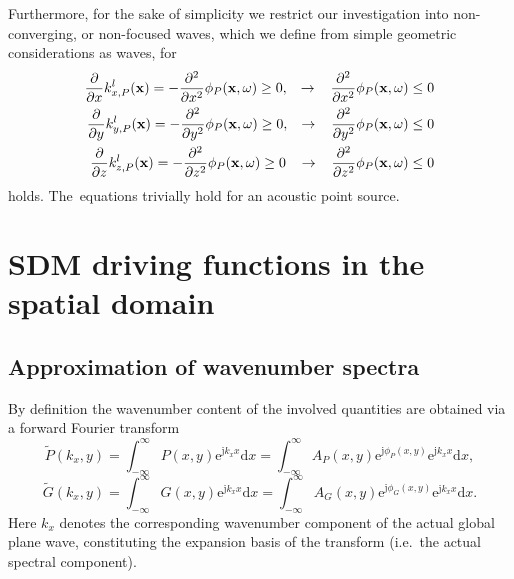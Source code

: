 \documentclass[12pt,a4paper]{article}
\newcommand{\td}{\mathrm{d}}
\newcommand{\te}{\mathrm{e}}
\newcommand{\ti}{\mathrm{j}}
\newcommand{\vx}{\mathbf{x}}
\begin{document}
Furthermore, for the sake of simplicity we restrict our investigation into non-converging, or non-focused waves, which we define from simple geometric considerations as waves, for 
\begin{eqnarray}
\frac{\partial}{\partial x} k_{x,P}^l(\vx) = -\frac{\partial^2}{\partial x^2} \phi_P (\vx,\omega) \geq 0, \hspace{3mm}\rightarrow \hspace{3mm} \frac{\partial^2}{\partial x^2} \phi_P (\vx,\omega) \leq 0\\
\frac{\partial}{\partial y} k_{y,P}^l(\vx) = -\frac{\partial^2}{\partial y^2} \phi_P (\vx,\omega) \geq 0, \hspace{3mm}\rightarrow \hspace{3mm} \frac{\partial^2}{\partial y^2} \phi_P (\vx,\omega) \leq 0\\
\frac{\partial}{\partial z} k_{z,P}^l(\vx) = -\frac{\partial^2}{\partial z^2} \phi_P (\vx,\omega) \geq 0 \hspace{3mm}\rightarrow \hspace{3mm} \frac{\partial^2}{\partial z^2} \phi_P (\vx,\omega) \leq 0
\end{eqnarray}
holds.
The~equations trivially hold for an acoustic point source.

\section{SDM driving functions in the spatial domain}

\subsection{Approximation of wavenumber spectra}
By definition the wavenumber content of the involved quantities are obtained via a forward Fourier transform
\begin{equation}
\tilde{P}(k_x,y) = \int_{-\infty}^{\infty} P(x,y) \te^{\ti k_x x} \td x = \int_{-\infty}^{\infty} A_P(x,y) \te^{\ti \phi_P(x,y)} \te^{\ti k_x x} \td x,
\end{equation}
\begin{equation}
\tilde{G}(k_x,y) = \int_{-\infty}^{\infty} G(x,y) \te^{\ti k_x x} \td x = \int_{-\infty}^{\infty} A_G(x,y) \te^{\ti \phi_G(x,y)} \te^{\ti k_x x} \td x.
\end{equation}
Here $k_x$ denotes the corresponding wavenumber component of the actual global plane wave, constituting the expansion basis of the transform (i.e.\ the actual spectral component).
\end{document}
